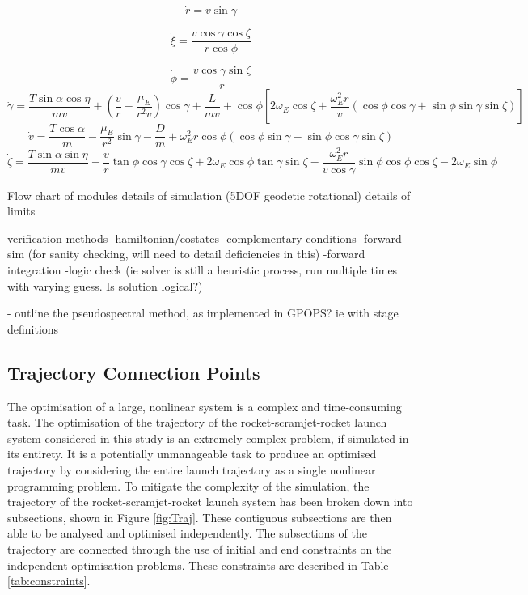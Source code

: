 \begin{equation}
\dot{r} = v \sin \gamma
\end{equation}

\begin{equation}
\dot{\xi} = \frac{v\cos \gamma \cos \zeta}{r \cos \phi}
\end{equation}

\begin{equation}
\dot{\phi} = \frac{v\cos\gamma\sin\zeta}{r}
\end{equation}
\begin{equation}
\dot{\gamma} = \frac{T\sin\alpha \cos\eta}{mv} + (\frac{v}{r}-\frac{\mu_E}{r^2 v})\cos\gamma + \frac{L}{mv}
+ \cos\phi[2\omega_E \cos\zeta + \frac{\omega_E^2 r}{v}(\cos\phi\cos\gamma+\sin\phi\sin\gamma\sin\zeta)]
\end{equation}
\begin{equation}
\dot{v} = \frac{T\cos\alpha}{m}-\frac{\mu_E}{r^2}\sin\gamma - \frac{D}{m}
+ \omega_E^2 r\cos\phi(\cos\phi\sin\gamma-\sin\phi\cos\gamma\sin\zeta)
\end{equation}
\begin{equation}
\dot{\zeta} = \frac{T\sin\alpha \sin\eta}{mv}-\frac{v}{r}\tan\phi\cos\gamma\cos\zeta +2\omega_E\cos\phi\tan\gamma\sin\zeta - \frac{\omega_E^2 r}{v\cos\gamma}\sin\phi\cos\phi\cos\zeta-2\omega_E\sin\phi 
\end{equation}



	Flow chart of modules
	details of simulation (5DOF geodetic rotational)
	details of limits
	
	verification methods
	-hamiltonian/costates
	-complementary conditions
	-forward sim (for sanity checking, will need to detail deficiencies in this)
	-forward integration
	-logic check (ie solver is still a heuristic process, run multiple times with varying guess. Is solution logical?)



- outline the pseudospectral method, as implemented in GPOPS? ie with stage definitions

\subsection{Trajectory Connection Points}

The optimisation of a large, nonlinear system is a complex and time-consuming task. The optimisation of the trajectory of the rocket-scramjet-rocket launch system considered in this study is an extremely complex problem, if simulated in its entirety. It is a potentially unmanageable task to produce an optimised trajectory by considering the entire launch trajectory as a single nonlinear programming problem. 
To mitigate the complexity of the simulation, the trajectory of the rocket-scramjet-rocket launch system has been broken down into subsections, shown in Figure \ref{fig:Traj}. These contiguous subsections are then able to be analysed and optimised independently. The subsections of the trajectory are connected through the use of initial and end constraints on the independent optimisation problems. These constraints are described in Table \ref{tab:constraints}.

